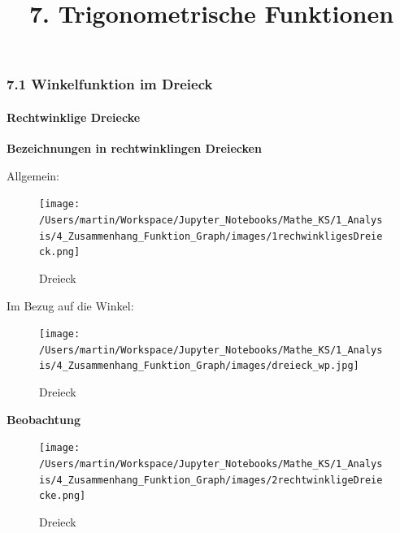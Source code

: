 \documentclass[
  11pt,
  a4paper,
  DIV=11,
  numbers=noendperiod]{scrartcl}
\title{7. Trigonometrische Funktionen}
\author{}
\date{}
\let\oldparagraph\paragraph
\renewcommand{\paragraph}[1]{\oldparagraph{#1}\mbox{}}
\begin{document}
\maketitle

\subsubsection{7.1 Winkelfunktion im
Dreieck}\label{winkelfunktion-im-dreieck}

\paragraph{Rechtwinklige Dreiecke}\label{rechtwinklige-dreiecke}

\textbf{Bezeichnungen in rechtwinklingen Dreiecken}

Allgemein:

\begin{figure}[H]

{\centering \texttt{[image: /Users/martin/Workspace/Jupyter\_Notebooks/Mathe\_KS/1\_Analysis/4\_Zusammenhang\_Funktion\_Graph/images/1rechwinkligesDreieck.png]}

}

\caption{Dreieck}

\end{figure}%

Im Bezug auf die Winkel:

\begin{figure}[H]

{\centering \texttt{[image: /Users/martin/Workspace/Jupyter\_Notebooks/Mathe\_KS/1\_Analysis/4\_Zusammenhang\_Funktion\_Graph/images/dreieck\_wp.jpg]}

}

\caption{Dreieck}

\end{figure}%

\textbf{Beobachtung}

\begin{figure}[H]

{\centering \texttt{[image: /Users/martin/Workspace/Jupyter\_Notebooks/Mathe\_KS/1\_Analysis/4\_Zusammenhang\_Funktion\_Graph/images/2rechtwinkligeDreiecke.png]}

}

\caption{Dreieck}

\end{figure}%
\end{document}
